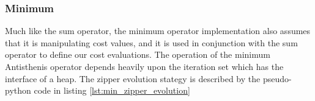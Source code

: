 \subsubsection{Minimum}

Much like the sum operator, the minimum operator implementation also
assumes that it is manipulating cost values, and it is used in
conjunction with the sum operator to define our cost evaluations. The
operation of the minimum Antisthenis operator depends heavily upon the
iteration set which has the interface of a heap. The zipper evolution
stategy is described by the pseudo-python code in listing
\ref{lst:min_zipper_evolution}

